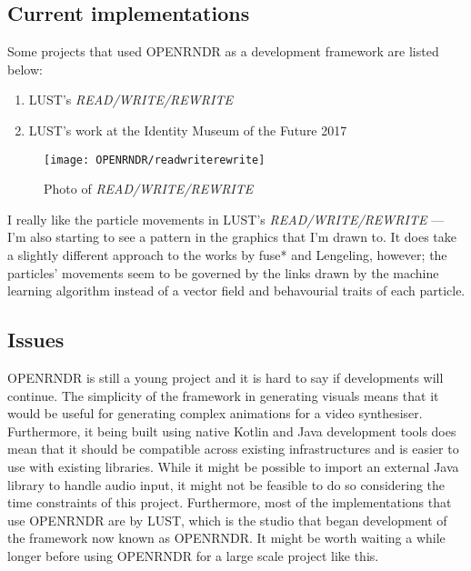 \documentclass[../main_frameworkreview.tex]{subfiles}
\begin{document}
\subsection{Current implementations}
Some projects that used OPENRNDR as a development framework are listed below:
\begin{enumerate}
\item LUST's \textit{READ/WRITE/REWRITE}\cite{ORml}
\item LUST's work at the Identity Museum of the Future 2017\cite{ORbinpacking}
\end{enumerate}
\begin{figure}
  \texttt{[image: OPENRNDR/readwriterewrite]}
  \caption{Photo of \textit{READ/WRITE/REWRITE}\cite{ORml}}
\end{figure}
I really like the particle movements in LUST's \textit{READ/WRITE/REWRITE} --- I'm also starting to see a pattern in the graphics that I'm drawn to. It does take a slightly different approach to the works by fuse* and Lengeling, however; the particles' movements seem to be governed by the links drawn by the machine learning algorithm instead of a vector field and behavourial traits of each particle.

\subsection{Issues}
OPENRNDR is still a young project and it is hard to say if developments will continue. The simplicity of the framework in generating visuals means that it would be useful for generating complex animations for a video synthesiser. Furthermore, it being built using native Kotlin and Java development tools does mean that it should be compatible across existing infrastructures and is easier to use with existing libraries. While it might be possible to import an external Java library to handle audio input, it might not be feasible to do so considering the time constraints of this project. Furthermore, most of the implementations that use OPENRNDR are by LUST, which is the studio that began development of the framework now known as OPENRNDR.\cite{ORsite} It might be worth waiting a while longer before using OPENRNDR for a large scale project like this.
\end{document}
